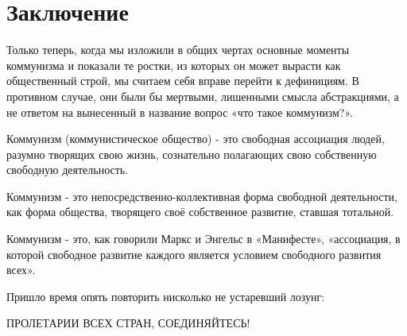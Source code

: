 \documentclass[../main]{subfiles}
\begin{document}
\ifSubfilesClassLoaded{\setcounter{page}{62}}{}
\section{Заключение}
\label{sec:11_zaklyuchenie}

Только теперь, когда мы изложили в общих чертах основные моменты коммунизма и показали те ростки, из которых он может вырасти как общественный строй, мы считаем себя вправе перейти к дефинициям. В противном случае, они были бы мертвыми, лишенными смысла абстракциями, а не ответом на вынесенный в название вопрос «что такое коммунизм?».

Коммунизм (коммунистическое общество) - это свободная ассоциация людей, разумно творящих свою жизнь, сознательно полагающих свою собственную свободную деятельность.

Коммунизм - это непосредственно-коллективная форма свободной деятельности, как форма общества, творящего своё собственное развитие, ставшая тотальной.

Коммунизм - это, как говорили Маркс и Энгельс в «Манифесте», «ассоциация, в которой свободное развитие каждого является условием свободного развития всех».

Пришло время опять повторить нисколько не устаревший лозунг:

ПРОЛЕТАРИИ ВСЕХ СТРАН, СОЕДИНЯЙТЕСЬ!
\end{document}
